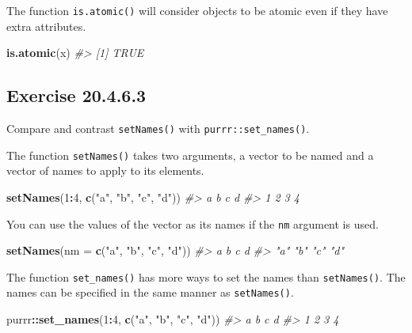 \documentclass[]{book}
\newenvironment{Shaded}{\begin{snugshade}}{\end{snugshade}}
\newcommand{\CommentTok}[1]{\textcolor[rgb]{0.56,0.35,0.01}{\textit{#1}}}
\newcommand{\DataTypeTok}[1]{\textcolor[rgb]{0.13,0.29,0.53}{#1}}
\newcommand{\DecValTok}[1]{\textcolor[rgb]{0.00,0.00,0.81}{#1}}
\newcommand{\KeywordTok}[1]{\textcolor[rgb]{0.13,0.29,0.53}{\textbf{#1}}}
\newcommand{\NormalTok}[1]{#1}
\newcommand{\OperatorTok}[1]{\textcolor[rgb]{0.81,0.36,0.00}{\textbf{#1}}}
\newcommand{\StringTok}[1]{\textcolor[rgb]{0.31,0.60,0.02}{#1}}
\theoremstyle{plain}
\theoremstyle{remark}
\begin{document}
The function \texttt{is.atomic()} will consider objects to be atomic even if they have extra attributes.

\begin{Shaded}
\begin{Highlighting}[]
\KeywordTok{is.atomic}\NormalTok{(x)}
\CommentTok{#> [1] TRUE}
\end{Highlighting}
\end{Shaded}

\hypertarget{exercise-20.4.6.3}{%
\subsection*{\texorpdfstring{Exercise {20.4.6.3}}{Exercise 20.4.6.3}}\label{exercise-20.4.6.3}}

Compare and contrast \texttt{setNames()} with \texttt{purrr::set\_names()}.

The function \texttt{setNames()} takes two arguments, a vector to be named and a vector
of names to apply to its elements.

\begin{Shaded}
\begin{Highlighting}[]
\KeywordTok{setNames}\NormalTok{(}\DecValTok{1}\OperatorTok{:}\DecValTok{4}\NormalTok{, }\KeywordTok{c}\NormalTok{(}\StringTok{"a"}\NormalTok{, }\StringTok{"b"}\NormalTok{, }\StringTok{"c"}\NormalTok{, }\StringTok{"d"}\NormalTok{))}
\CommentTok{#> a b c d }
\CommentTok{#> 1 2 3 4}
\end{Highlighting}
\end{Shaded}

You can use the values of the vector as its names if the \texttt{nm} argument is used.

\begin{Shaded}
\begin{Highlighting}[]
\KeywordTok{setNames}\NormalTok{(}\DataTypeTok{nm =} \KeywordTok{c}\NormalTok{(}\StringTok{"a"}\NormalTok{, }\StringTok{"b"}\NormalTok{, }\StringTok{"c"}\NormalTok{, }\StringTok{"d"}\NormalTok{))}
\CommentTok{#>   a   b   c   d }
\CommentTok{#> "a" "b" "c" "d"}
\end{Highlighting}
\end{Shaded}

The function \texttt{set\_names()} has more ways to set the names than \texttt{setNames()}.
The names can be specified in the same manner as \texttt{setNames()}.

\begin{Shaded}
\begin{Highlighting}[]
\NormalTok{purrr}\OperatorTok{::}\KeywordTok{set_names}\NormalTok{(}\DecValTok{1}\OperatorTok{:}\DecValTok{4}\NormalTok{, }\KeywordTok{c}\NormalTok{(}\StringTok{"a"}\NormalTok{, }\StringTok{"b"}\NormalTok{, }\StringTok{"c"}\NormalTok{, }\StringTok{"d"}\NormalTok{))}
\CommentTok{#> a b c d }
\CommentTok{#> 1 2 3 4}
\end{Highlighting}
\end{Shaded}
\end{document}
